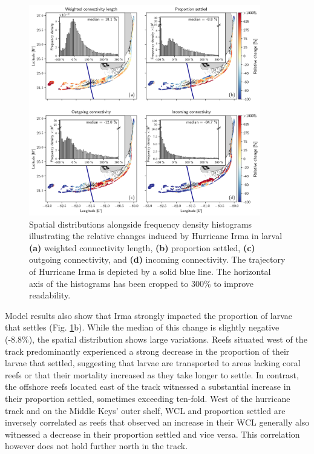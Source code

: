 \documentclass[fleqn,10pt]{wlscirep}
\newcommand{\modif}[1]{{#1}}
\begin{document}
\begin{figure}[tbp]
    \centering
    \includegraphics[width=0.9\textwidth]{figures/fig_connex_coral.png}
    \caption{Spatial distributions alongside frequency density histograms illustrating the relative changes induced by Hurricane Irma in larval \textbf{(a)} weighted connectivity length, \textbf{(b)} proportion settled, \textbf{(c)} outgoing connectivity, and \textbf{(d)} incoming connectivity. The trajectory of Hurricane Irma is depicted by a solid blue line. The horizontal axis of the histograms has been cropped to 300\% to improve readability.}
    \label{fig:Larvae}
\end{figure}

Model results also show that Irma strongly impacted the proportion of larvae that settles (Fig. \ref{fig:Larvae}b). While the median of this change is slightly negative (-8.8\%), the spatial distribution shows large variations. Reefs situated west of the track predominantly experienced a strong decrease in the proportion of their larvae that settled, suggesting that larvae are transported to areas lacking coral reefs or that their mortality increased as they take longer to settle. In contrast, the offshore reefs located east of the track witnessed a substantial increase in their proportion settled, sometimes exceeding ten-fold. West of the hurricane track and on the Middle \modif{Keys'} outer shelf, WCL and proportion settled are inversely correlated as reefs that observed an increase in their WCL generally also witnessed a decrease in their proportion settled and vice versa. This correlation however does not hold further north in the track.
\end{document}
